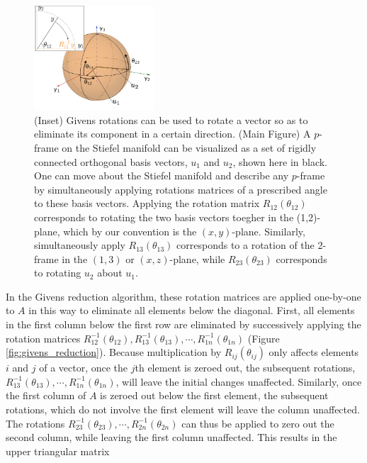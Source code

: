 \documentclass[ba]{imsart}
\numberwithin{equation}{section}
\theoremstyle{plain}
\begin{document}
\begin{figure}[h]
\centering
\vspace{.1in}
\includegraphics[width=0.4\textwidth]{figures/stiefel_geom_new.png}
\vspace{.05in}
\caption{(Inset) Givens rotations can be used to rotate a vector so as to eliminate its component in a certain direction. (Main Figure) A $p$-frame on the Stiefel manifold can be visualized as a set of rigidly connected orthogonal basis vectors, $u_1$ and $u_2$, shown here in black. One can move about the Stiefel manifold and describe any $p$-frame by simultaneously applying rotations matrices of a prescribed angle to these basis vectors. Applying the rotation matrix $R_{12}(\theta_{12})$ corresponds to rotating the two basis vectors toegher in the (1,2)-plane, which by our convention is the $(x,y)$-plane. Similarly, simultaneously apply $R_{13}(\theta_{13})$ corresponds to a rotation of the 2-frame in the $(1,3)$ or $(x,z)$-plane, while $R_{23}(\theta_{23})$ corresponds to rotating $u_2$ about $u_1$.}
\label{fig:StiefelGeom}
\end{figure}

\noindent In the Givens reduction algorithm, these rotation matrices are applied one-by-one to $A$ in this way to eliminate all elements below the diagonal. First, all elements in the first column below the first row are eliminated by successively applying the rotation matrices $R_{12}^{-1}(\theta_{12}), R_{13}^{-1}(\theta_{13}), \cdots, R_{1n}^{-1}(\theta_{1n})$  (Figure \ref{fig:givens_reduction}). Because multiplication by $R_{ij}(\theta_{ij})$ only affects elements $i$ and $j$ of a vector, once the $j$th element is zeroed out, the subsequent rotations, $R_{13}^{-1}(\theta_{13}), \cdots, R_{1n}^{-1}(\theta_{1n})$, will leave the initial changes unaffected. Similarly, once the first column of $A$ is zeroed out below the first element, the subsequent rotations, which do not involve the first element will leave the column unaffected. The rotations  $R_{23}^{-1}(\theta_{23}), \cdots, R_{2n}^{-1}(\theta_{2n})$ can thus be applied to zero out the second column, while leaving the first column unaffected. This results in the upper triangular matrix
\end{document}
